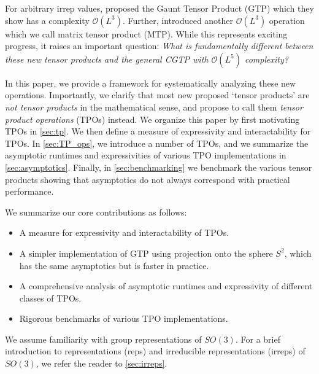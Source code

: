 \documentclass{article}
\renewcommand{\O}{\mathcal{O}}
\theoremstyle{definition}
\theoremstyle{remark}
\begin{document}
For arbitrary irrep values, \citet{gaunt} proposed the Gaunt Tensor Product (GTP) which they show has a complexity $\O(L^3)$. Further, \citet{unke2024e3x} introduced another $\O(L^3)$ operation which we call matrix tensor product (MTP). While this represents exciting progress, it raises an important question: \emph{What is fundamentally different between these new tensor products and the general CGTP with $\O(L^5)$ complexity?}


In this paper, we provide a framework for systematically analyzing these new operations. Importantly, we clarify that most new proposed `tensor products' are \emph{not tensor products} in the mathematical sense, and propose to call them \emph{tensor product operations} (TPOs) instead.
We organize this paper by first motivating TPOs in \autoref{sec:tp}. We then define a measure of expressivity and interactability for TPOs. In \autoref{sec:TP_ops}, we introduce a number of TPOs, and we summarize the asymptotic runtimes and expressivities of various TPO implementations in \autoref{sec:asymptotics}. Finally, in \autoref{sec:benchmarking} we benchmark the various tensor products showing that asymptotics do not always correspond with practical performance.

We summarize our core contributions as follows:
\begin{itemize}[leftmargin=1em,itemsep=0em,topsep=0em]
    \item A measure for expressivity and interactability of TPOs.
    \item A simpler implementation of GTP using projection onto the sphere $S^2$, which has the same asymptotics but is faster in practice.
    \item A comprehensive analysis of asymptotic runtimes and expressivity of different classes of TPOs.
    \item Rigorous benchmarks of various TPO implementations.
\end{itemize}

We assume familiarity with group representations of $SO(3)$. For a brief introduction to representations (reps) and irreducible representations (irreps) of $SO(3)$, we refer the reader to \autoref{sec:irreps}. 

\end{document}
